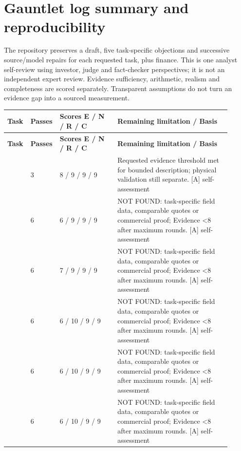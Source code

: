 \documentclass[11pt,a4paper]{article}
\begin{document}
\clearpage\section{Gauntlet log summary and reproducibility}
The repository preserves a draft, five task-specific objections and successive source/model repairs for each requested task, plus finance. This is one analyst self-review using investor, judge and fact-checker perspectives; it is not an independent expert review. Evidence sufficiency, arithmetic, realism and completeness are scored separately. Transparent assumptions do not turn an evidence gap into a sourced measurement.

{\footnotesize
\setlength{\tabcolsep}{3pt}\renewcommand{\arraystretch}{1.18}
\begin{longtable}{@{}>{\raggedright\arraybackslash}p{0.0897\linewidth}>{\raggedright\arraybackslash}p{0.0762\linewidth}>{\raggedright\arraybackslash}p{0.2510\linewidth}>{\raggedright\arraybackslash}p{0.4931\linewidth}@{}}
\toprule \textbf{Task} & \textbf{Passes} & \textbf{Scores E / N / R / C} & \textbf{Remaining limitation / Basis} \\ \midrule
\endfirsthead\toprule \textbf{Task} & \textbf{Passes} & \textbf{Scores E / N / R / C} & \textbf{Remaining limitation / Basis} \\ \midrule
\endhead\bottomrule\endfoot
01 & \num{3} & \num{8} / \num{9} / \num{9} / \num{9} & Requested evidence threshold met for bounded description; physical validation still separate. [A] self-assessment \\
02 & \num{6} & \num{6} / \num{9} / \num{9} / \num{9} & NOT FOUND: task-specific field data, comparable quotes or commercial proof; Evidence <8 after maximum rounds. [A] self-assessment \\
03 & \num{6} & \num{7} / \num{9} / \num{9} / \num{9} & NOT FOUND: task-specific field data, comparable quotes or commercial proof; Evidence <8 after maximum rounds. [A] self-assessment \\
04 & \num{6} & \num{6} / \num{10} / \num{9} / \num{9} & NOT FOUND: task-specific field data, comparable quotes or commercial proof; Evidence <8 after maximum rounds. [A] self-assessment \\
05 & \num{6} & \num{6} / \num{10} / \num{9} / \num{9} & NOT FOUND: task-specific field data, comparable quotes or commercial proof; Evidence <8 after maximum rounds. [A] self-assessment \\
06 & \num{6} & \num{6} / \num{10} / \num{9} / \num{9} & NOT FOUND: task-specific field data, comparable quotes or commercial proof; Evidence <8 after maximum rounds. [A] self-assessment \\

\end{longtable}}
\end{document}
